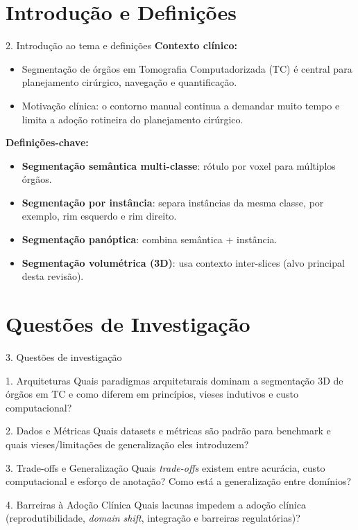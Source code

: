 \documentclass[aspectratio=169]{beamer}
\begin{document}
\section{Introdução e Definições}
\begin{frame}{2. Introdução ao tema e definições}
\small
\textbf{Contexto clínico:}
\begin{itemize}
	\item Segmentação de órgãos em Tomografia Computadorizada (TC) é central para planejamento cirúrgico, navegação e quantificação.
	\item Motivação clínica: o contorno manual continua a demandar muito tempo e limita a adoção rotineira do planejamento cirúrgico.
\end{itemize}

\textbf{Definições-chave:}
\begin{itemize}
	\item \textbf{Segmentação semântica multi-classe}: rótulo por voxel para múltiplos órgãos.
	\item \textbf{Segmentação por instância}: separa instâncias da mesma classe, por exemplo, rim esquerdo e rim direito.
	\item \textbf{Segmentação panóptica}: combina semântica + instância.
	\item \textbf{Segmentação volumétrica (3D)}: usa contexto inter-slices (alvo principal desta revisão).
\end{itemize}
\end{frame}

\section{Questões de Investigação}
\begin{frame}{3. Questões de investigação}
\small
\begin{block}{1. Arquiteturas}
Quais paradigmas arquiteturais dominam a segmentação 3D de órgãos em TC e como diferem em princípios, vieses indutivos e custo computacional?
\end{block}

\begin{block}{2. Dados e Métricas}
Quais datasets e métricas são padrão para benchmark e quais vieses/limitações de generalização eles introduzem?
\end{block}

\begin{block}{3. Trade-offs e Generalização}
Quais \textit{trade-offs} existem entre acurácia, custo computacional e esforço de anotação? Como está a generalização entre domínios?
\end{block}

\begin{block}{4. Barreiras à Adoção Clínica}
Quais lacunas impedem a adoção clínica (reprodutibilidade, \textit{domain shift}, integração e barreiras regulatórias)?
\end{block}
\end{frame}
\end{document}
